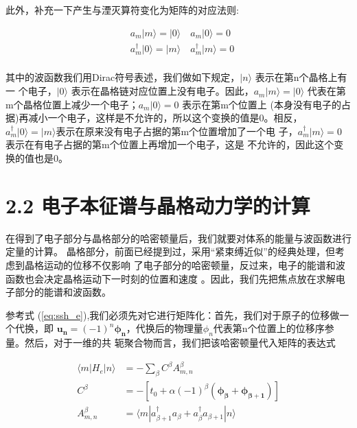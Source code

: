 \documentclass[12pt,]{report}
\begin{document}
此外，补充一下产生与湮灭算符变化为矩阵的对应法则:

\begin{equation} \label{eq:operator}
\begin{split}
& a_m | m \rangle = |0 \rangle \quad
 a_m | 0 \rangle = 0 \\
& a_m^\dagger | 0 \rangle = |m \rangle \quad
 a_m^\dagger | m \rangle = 0 \\
\end{split}
\end{equation}

\noindent
其中的波函数我们用Dirac符号表述，我们做如下规定，\(| n \rangle\)
表示在第n个晶格上有一 个电子，\(| 0 \rangle\)
表示在晶格链对应位置上没有电子。因此，\(a_m | m \rangle = |0 \rangle\)
代表在第m个晶格位置上减少一个电子；\(a_m | 0 \rangle = 0\)
表示在第m个位置上
(本身没有电子的占据)再减小一个电子，这样是不允许的，所以这个变换的值是\(0\)。相反，
\(a_m^\dagger | 0 \rangle = |m \rangle\)表示在原来没有电子占据的第m个位置增加了一个电
子，\(a_m^\dagger | m \rangle = 0\)
表示在有电子占据的第m个位置上再增加一个电子，这是
不允许的，因此这个变换的值也是\(0\)。

\section{2.2
电子本征谱与晶格动力学的计算}\label{ux7535ux5b50ux672cux5f81ux8c31ux4e0eux6676ux683cux52a8ux529bux5b66ux7684ux8ba1ux7b97}

在得到了电子部分与晶格部分的哈密顿量后，我们就要对体系的能量与波函数进行定量的计算。
晶格部分，前面已经提到过，采用``紧束缚近似''的经典处理，但考虑到晶格运动的位移不仅影响
了电子部分的哈密顿量，反过来，电子的能谱和波函数也会决定晶格运动下一时刻的位置和速度
。因此，我们先把焦点放在求解电子部分的能谱和波函数。

参考式
(\ref{eq:ssh_e}),我们必须先对它进行矩阵化：首先，我们对于原子的位移做一个代换，即
\(\bm{u_n} = (-1)^n \bm{\phi_n}\)，代换后的物理量\(\phi_n\)代表第n个位置上的位移序参量。然后，对于一维的共
轭聚合物而言，我们把该哈密顿量代入矩阵的表达式

\begin{equation}
\begin{aligned}
\langle m|H_e|n\rangle &=-\sum\limits_{\beta}C^\beta A_{m,n}^\beta \\
C^\beta&=-[t_0+\alpha (-1)^\beta (\bm{\phi_\beta} + \bm{\phi_{\beta + 1}})] \\
A_{m,n}^\beta&=\langle m|a_{\beta+1}^\dagger a_\beta + a_\beta^\dagger
a_{\beta+1}|n \rangle
\end{aligned}
\end{equation}
\end{document}
